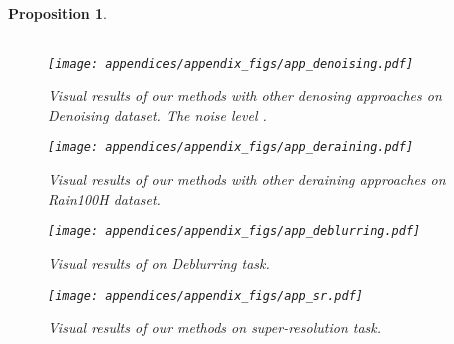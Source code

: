 \documentclass{article}
\theoremstyle{plain}
\newtheorem{proposition}[theorem]{Proposition}
\theoremstyle{definition}
\theoremstyle{remark}
\begin{document}
\begin{proposition}
\begin{table}[ht]
\begin{minipage}[h]{1.\linewidth}
\begin{center}
\begin{small}
\begin{sc}
{\begin{tabular}{lcccccccccccc}
\bottomrule
\end{tabular}
}
\end{sc}
\end{small}
\end{center}
\vskip -0.1in
\end{minipage}

\end{table}




\begin{figure}[ht]
\begin{center}
\centerline{\texttt{[image: appendices/appendix\_figs/app\_denoising.pdf]}}\vspace{-2.0mm}
\caption{Visual results of our methods with other denosing approaches on Denoising dataset. The noise level .}
\label{app-fig:denosing_results}
\end{center}
\vskip -0.2in
\end{figure}

\begin{figure}[ht]
\begin{center}
\centerline{\texttt{[image: appendices/appendix\_figs/app\_deraining.pdf]}}\vspace{-2.0mm}
\caption{Visual results of our methods with other deraining approaches on Rain100H dataset.}
\label{app-fig:deraining_results}
\end{center}
\vskip -0.2in
\end{figure}

\begin{figure}[ht]
\begin{center}
\centerline{\texttt{[image: appendices/appendix\_figs/app\_deblurring.pdf]}}\vspace{-2.0mm}
\caption{Visual results of on Deblurring task.}
\label{app-fig:deblurring_results}
\end{center}
\vskip -0.2in
\end{figure}

\begin{figure}[ht]
\begin{center}
\centerline{\texttt{[image: appendices/appendix\_figs/app\_sr.pdf]}}\vspace{-2.0mm}
\caption{Visual results of our methods on super-resolution task.}
\label{app-fig:sr_results}
\end{center}
\vskip -0.2in
\end{figure}


\end{proposition}
\end{document}

